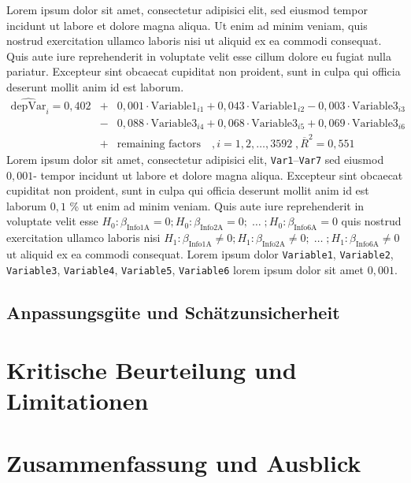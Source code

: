 \documentclass[12pt, a4paper, oneside]{article}
\begin{document}
Lorem ipsum dolor sit amet, consectetur adipisici elit, sed eiusmod tempor incidunt ut labore et dolore magna aliqua. Ut enim ad minim veniam, quis nostrud exercitation ullamco laboris nisi ut aliquid ex ea commodi consequat. Quis aute iure reprehenderit in voluptate velit esse cillum dolore eu fugiat nulla pariatur. Excepteur sint obcaecat cupiditat non proident, sunt in culpa qui officia deserunt mollit anim id est laborum.
%
\begin{eqnarray}
\widehat{\text{depVar}}_i  = 0{,}402 &+& 0{,}001\cdot\text{Variable1}_{i1}+ 0{,}043\cdot\text{Variable1}_{i2}  -0{,}003 \cdot \text{Variable3}_{i3} \nonumber\\\nonumber
&-& 0{,}088 \cdot  \text{Variable3}_{i4}+ 0{,}068 \cdot  \text{Variable3}_{i5} + 0{,}069 \cdot \text{Variable3}_{i6}\\\nonumber
 &+& \text{remaining factors} \quad, i=1,2,\ldots , 3592 \; , \overline{R}^2=0{,}551\nonumber
\end{eqnarray}
%
Lorem ipsum dolor sit amet, consectetur adipisici elit, \texttt{Var1}--\texttt{Var7}  sed eiusmod $0{,}001$- tempor incidunt ut labore et dolore magna aliqua. Excepteur sint obcaecat cupiditat non proident, sunt in culpa qui officia deserunt mollit anim id est laborum $0{,}1$ \% ut enim ad minim veniam. Quis aute iure reprehenderit in voluptate velit esse $H_0:\beta_\text{Info1A}=0; H_0:\beta_\text{Info2A}=0; \;\ldots \; ; H_0:\beta_\text{Info6A}=0$ quis nostrud exercitation ullamco laboris nisi $H_1:\beta_\text{Info1A}\ne 0; H_1:\beta_\text{Info2A}\ne 0; \;\ldots \; ; H_1:\beta_\text{Info6A}\ne 0$ ut aliquid ex ea commodi consequat. Lorem ipsum dolor \texttt{Variable1}, \texttt{Variable2}, \texttt{Variable3}, \texttt{Variable4}, \texttt{Variable5}, \texttt{Variable6} lorem ipsum dolor sit amet $0{,}001$.\\ 

\subsection{Anpassungsgüte und Schätzunsicherheit}

\section{Kritische Beurteilung und Limitationen}

\section{Zusammenfassung und Ausblick}
\end{document}
